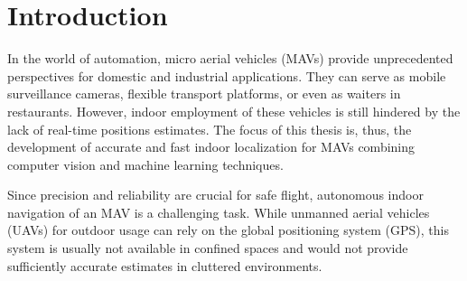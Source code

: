 \chapter{Introduction}
\label{chap:introduction}


In the world of automation, micro aerial vehicles (MAVs) provide unprecedented perspectives for domestic and industrial applications. They can serve as mobile surveillance cameras, flexible transport platforms, or even as waiters in restaurants. However, indoor employment of these vehicles
is still hindered by the lack of real-time positions estimates. The focus of this thesis is,
thus, the development of accurate and fast indoor localization for
MAVs combining computer vision and machine learning techniques.


Since precision and reliability are crucial for safe flight, autonomous indoor navigation of an MAV is a
challenging task. While unmanned aerial vehicles (UAVs) for
outdoor usage can rely on the global positioning system (GPS), this system is
usually not available in confined spaces and would not provide
sufficiently accurate estimates in cluttered environments.